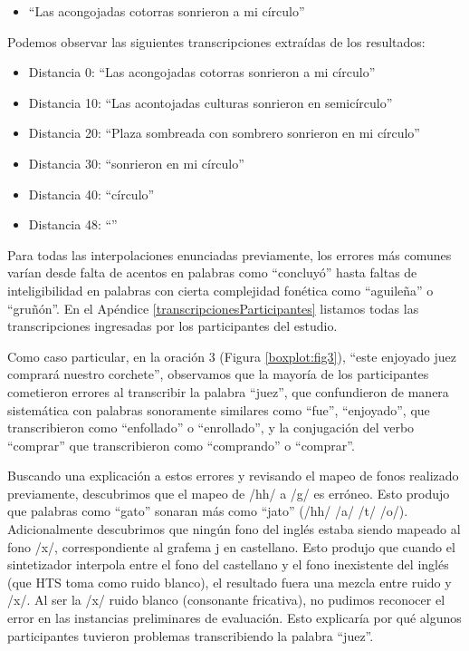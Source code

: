 \begin{itemize}
	\item ``Las acongojadas cotorras sonrieron a mi círculo''
\end{itemize}

Podemos observar las siguientes transcripciones extraídas de los resultados:

\begin{itemize}
	\item Distancia 0: ``Las acongojadas cotorras sonrieron a mi círculo''
	\item Distancia 10: ``Las acontojadas culturas sonrieron en semicírculo''
	\item Distancia 20: ``Plaza sombreada con sombrero sonrieron en mi círculo''
	\item Distancia 30: ``sonrieron en mi círculo''
	\item Distancia 40: ``círculo''
	\item Distancia 48: ``''
\end{itemize}

Para todas las interpolaciones enunciadas previamente, los errores más comunes varían desde falta de acentos en palabras como ``concluyó'' hasta faltas de inteligibilidad en palabras con cierta complejidad fonética como ``aguileña'' o ``gruñón''. En el Apéndice \ref{transcripcionesParticipantes} listamos todas las transcripciones ingresadas por los participantes del estudio.

Como caso particular, en la oración $3$ (Figura \ref{boxplot:fig3}), ``este enjoyado juez comprará nuestro corchete'', observamos que la mayoría de los participantes cometieron errores al transcribir la palabra ``juez'', que confundieron de manera sistemática con palabras sonoramente similares como ``fue'', ``enjoyado'', que transcribieron como ``enfollado'' o ``enrollado'', y la conjugación del verbo ``comprar'' que transcribieron como ``comprando'' o ``comprar''.

Buscando una explicación a estos errores y revisando el mapeo de fonos realizado previamente, descubrimos que el mapeo de /hh/ a /g/ es erróneo. Esto produjo que palabras como ``gato'' sonaran más como ``jato'' (/hh/ /a/ /t/ /o/). Adicionalmente descubrimos que ningún fono del inglés estaba siendo mapeado al fono /x/, correspondiente al grafema j en castellano. Esto produjo que cuando el sintetizador interpola entre el fono del castellano y el fono inexistente del inglés (que HTS toma como ruido blanco), el resultado fuera una mezcla entre ruido y /x/. Al ser la /x/ ruido blanco (consonante fricativa), no pudimos reconocer el error en las instancias preliminares de evaluación. Esto explicaría por qué algunos participantes tuvieron problemas transcribiendo la palabra ``juez''.

